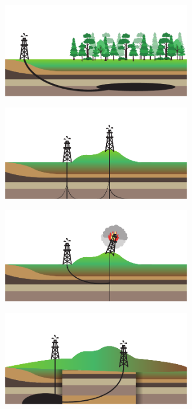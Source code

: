 \begin{figure}[ht]
	\centering
	\begin{subfigure}[b]{0.45\textwidth}
		\includegraphics[width=0.9\textwidth]{img/appdd1.pdf}
		\caption{\label{fig:app1}}
	\end{subfigure}
	\begin{subfigure}[b]{0.45\textwidth}
		\includegraphics[width=0.9\textwidth]{img/appdd2.pdf}
		\caption{\label{fig:app2}}
	\end{subfigure}
	\begin{subfigure}[b]{0.45\textwidth}
		\includegraphics[width=0.9\textwidth]{img/appdd3.pdf}
		\caption{\label{fig:app3}}
	\end{subfigure}
	\begin{subfigure}[b]{0.45\textwidth}
		\includegraphics[width=0.9\textwidth]{img/appdd4.pdf}

\end{subfigure}
\end{figure}
